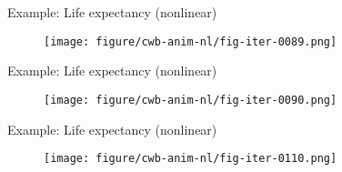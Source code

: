 \begin{frame}{Example: Life expectancy (nonlinear)}
	\begin{figure}
		\centering
		\texttt{[image: figure/cwb-anim-nl/fig-iter-0089.png]}
	\end{figure}
	\addtocounter{framenumber}{-1}
\end{frame}


\begin{frame}{Example: Life expectancy (nonlinear)}
	\begin{figure}
		\centering
		\texttt{[image: figure/cwb-anim-nl/fig-iter-0090.png]}
	\end{figure}
	\addtocounter{framenumber}{-1}
\end{frame}


\begin{frame}{Example: Life expectancy (nonlinear)}
	\begin{figure}
		\centering
		\texttt{[image: figure/cwb-anim-nl/fig-iter-0110.png]}
	\end{figure}
	\addtocounter{framenumber}{-1}
\end{frame}

